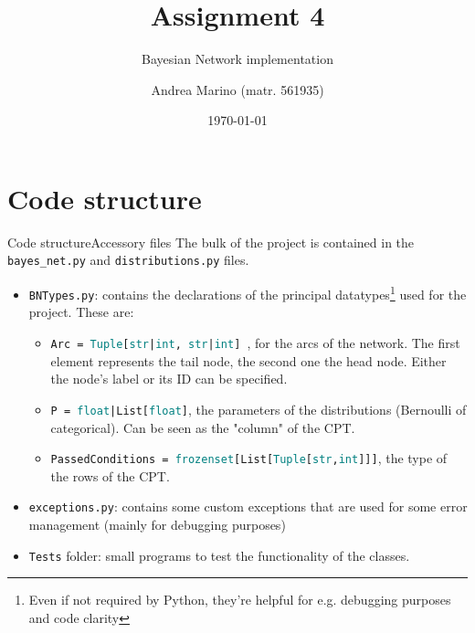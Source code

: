 \documentclass[10pt,xcolor={table,dvipsnames}]{beamer} 		%
\title[ISPR - 4th Assignment]{Assignment 4}
\subtitle{Bayesian Network implementation}
\author[Andrea Marino]{Andrea Marino \small{(matr. 561935)}}
\institute[DI UniPi]{Università di Pisa, dipartimento di Informatica}
\date{\today}
\theoremstyle{plain}					%
\theoremstyle{definition}
\theoremstyle{remark}
\newcommand{\teal}[1]{\textcolor{teal}{#1}}
\newcommand{\plb}[1]{\textcolor{pythonlb}{#1}}
\begin{document}
	\begin{frame}[plain]
		\titlepage
	\end{frame}


\section*{Code structure}
	\begin{frame}{Code structure}{Accessory files}
		The bulk of the project is contained in the \texttt{bayes\_net.py}
		and \texttt{distributions.py} files.

		\begin{itemize}
			\item<2-> \texttt{BNTypes.py}: contains the declarations of the principal 
			datatypes\footnote{Even if not required by Python,
			they're helpful for e.g. debugging purposes and code clarity} used for the project. 
			These are:
			\begin{itemize}
				\item<3-> \texttt{\plb{Arc} =
					\teal{Tuple}[\teal{str}|\teal{int},
					\teal{str}|\teal{int}]
					}, for the arcs of the network. 
					The first element represents the tail node, 
					the second one the head node. 
					Either the node's label or its ID can be specified.  
				\item<4-> \texttt{\plb{P} = \teal{float}|\plb{List}[\teal{float}]}, 
				the parameters of the distributions (Bernoulli of categorical). 
				Can be seen as the "column" of the CPT.
				\item<5-> \texttt{\plb{PassedConditions} = \teal{frozenset}[\plb{List}[\teal{Tuple}[\teal{str},\teal{int}]]]}, 
				the type of the rows of the CPT. 
			\end{itemize}
			\item<7-> \texttt{exceptions.py}: contains some custom exceptions that are 
			used for some error management (mainly for debugging purposes)
			\item<8-> \texttt{Tests} folder: small programs to test the functionality
			of the classes.
		\end{itemize}
	\end{frame}
\end{document}
